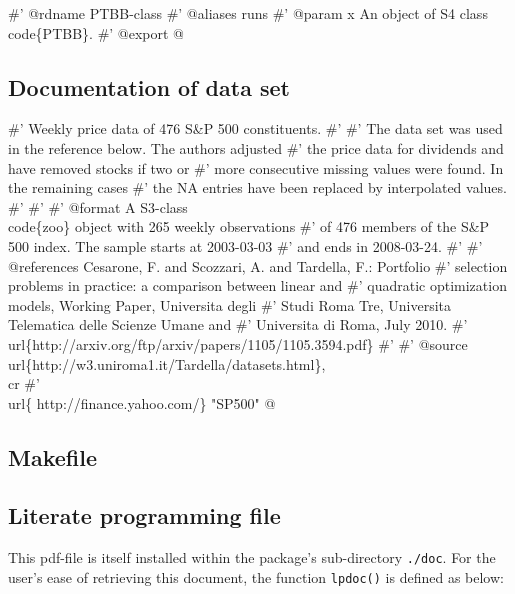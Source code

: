 \documentclass[a4paper]{article}
\begin{document}
\nwenddocs{}\endmoddef
#' @rdname PTBB-class
#' @aliases runs
#' @param x An object of S4 class \\code\{PTBB\}.
#' @export
\nwendcode{}@

\subsection{Documentation of data set}

\nwenddocs{}\endmoddef\let\nwnotused=\nwoutput{}
#' Weekly price data of 476 S&P 500 constituents.
#'
#' The data set was used in the reference below. The authors adjusted
#' the price data for dividends and have removed stocks if two or
#' more consecutive missing values were found. In the remaining cases
#' the NA entries have been replaced by interpolated values.
#'
#'
#' @format A S3-class \\code\{zoo\} object with 265 weekly observations
#' of 476 members of the S&P 500 index. The sample starts at 2003-03-03
#' and ends in 2008-03-24.
#'
#' @references Cesarone, F. and Scozzari, A. and Tardella, F.: Portfolio
#'     selection problems in practice: a comparison between linear and
#'     quadratic optimization models, Working Paper, Universita degli
#'     Studi Roma Tre, Universita Telematica delle Scienze Umane and
#'     Universita di Roma, July 2010.
#'     \\url\{http://arxiv.org/ftp/arxiv/papers/1105/1105.3594.pdf\}
#'
#' @source \\url\{http://w3.uniroma1.it/Tardella/datasets.html\},\\cr
#' \\url\{ http://finance.yahoo.com/\}
"SP500"
\nwnotused{data.R}\nwendcode{}@

\subsection{Makefile}
\label{smake}

\subsection{Literate programming file}
This pdf-file is itself installed within the package's sub-directory
\verb?./doc?. For the user's ease of retrieving this document, the
function \verb?lpdoc()? is defined as below:
\end{document}
